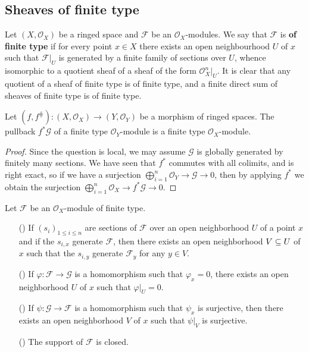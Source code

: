 \subsection{Sheaves of finite type}
Let $(X,\mathscr{O}_X)$ be a ringed space and $\mathscr{F}$ be an $\mathscr{O}_X$-modules. We say that $\mathscr{F}$ is \textbf{of finite type} if for every point $x\in X$ there exists an open neighbourhood $U$ of $x$ such that $\mathscr{F}|_U$ is generated by a finite family of sections over $U$, whence isomorphic to a quotient sheaf of a sheaf of the form $\mathscr{O}_X^n|_U$. It is clear that any quotient of a sheaf of finite type is of finite type, and a finite direct sum of sheaves of finite type is of finite type. 
\begin{proposition}\label{sheaf of module ft inverse image is ft}
Let $(f,f^{\hash}):(X,\mathscr{O}_X)\to(Y,\mathscr{O}_Y)$ be a morphism of ringed spaces. The pullback $f^*\mathscr{G}$ of a finite type $\mathscr{O}_Y$-module is a finite type $\mathscr{O}_X$-module.
\end{proposition}
\begin{proof}
Since the question is local, we may assume $\mathscr{G}$ is globally generated by finitely many sections. We have seen that $f^*$ commutes with all colimits, and is right exact, so if we have a surjection $\bigoplus_{i=1}^{n}\mathscr{O}_Y\to\mathscr{G}\to 0$, then by applying $f^*$ we obtain the surjection $\bigoplus_{i=1}^{n}\mathscr{O}_X\to f^*\mathscr{G}\to 0$.
\end{proof}
\begin{proposition}\label{sheaf of module ft local prop}
Let $\mathscr{F}$ be an $\mathscr{O}_X$-module of finite type.
\begin{itemize}
\item[(\rmnum{1})] If $(s_i)_{1\leq i\leq n}$ are sections of $\mathscr{F}$ over an open neighborhood $U$ of a point $x$ and if the $s_{i,x}$ generate $\mathscr{F}$, then there exists an open neighborhood $V\subseteq U$ of $x$ such that the $s_{i,y}$ generate $\mathscr{F}_y$ for any $y\in V$.
\item[(\rmnum{2})] If $\varphi:\mathscr{F}\to\mathscr{G}$ is a homomorphism such that $\varphi_x=0$, there exists an open neighborhood $U$ of $x$ such that $\varphi|_U=0$.
\item[(\rmnum{3})] If $\psi:\mathscr{G}\to\mathscr{F}$ is a homomorphism such that $\psi_x$ is surjective, then there exists an open neighborhood $V$ of $x$ such that $\psi|_V$ is surjective.
\item[(\rmnum{4})] The support of $\mathscr{F}$ is closed. 
\end{itemize}
\end{proposition}
